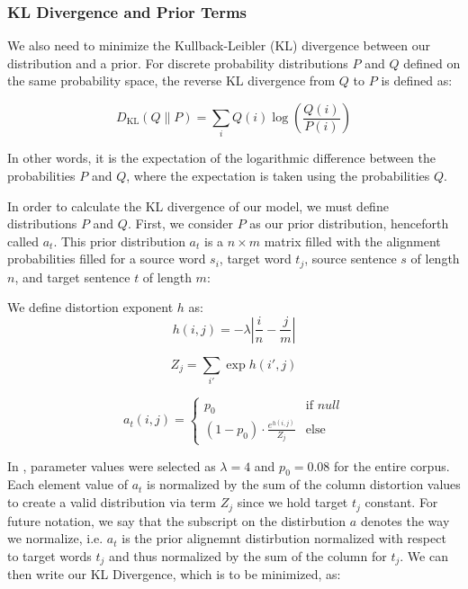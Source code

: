 \documentclass[twoside,twocolumn]{article}
\begin{document}
\subsubsection{KL Divergence and Prior Terms}

We also need to minimize the Kullback-Leibler (KL) divergence between our
distribution and a prior. For discrete probability distributions $P$ and $Q$
defined on the same probability space, the reverse KL divergence from $Q$ to
$P$ is defined as:

\begin{equation}
D_{\mathrm{KL}}(Q \| P) = \sum_{i} Q(i) \log \left( \frac{Q(i)}{P(i)} \right)
\end{equation}

In other words, it is the expectation of the logarithmic difference between the
probabilities $P$ and $Q$, where the expectation is taken using the
probabilities $Q$.

In order to calculate the KL divergence of our model, we must define
distributions $P$ and $Q$. First, we consider $P$ as our prior
distribution, henceforth called $a_t$. This prior distribution $a_t$ is a
$n \times m$ matrix filled with the alignment probabilities filled for a source
word $s_i$, target word $t_j$, source sentence $s$ of length $n$, and target
sentence $t$ of length $m$:

We define distortion exponent $h$ as:
\begin{equation}
  h(i, j) = {-\lambda \left| \frac{i}{n} - \frac{j}{m}\right|}
\end{equation}

\begin{equation}
  Z_j = \sum_{i'} \exp h(i', j)
\end{equation}

\begin{equation}
a_t (i, j) =
\begin{cases}
      p_0 & \text{if } null \\
     (1-p_0) \cdot \frac{e^{h(i,j)}}{Z_j} & \text{else}
   \end{cases}
\end{equation}

In \cite{dyer2013simple}, parameter values were selected as $\lambda=4$ and $p_0=0.08$
for the entire corpus. Each element value of $a_t$ is normalized by the sum of the column
distortion values to create a valid distribution via term $Z_j$ since we hold target $t_j$ constant. For future notation, we say that the subscript on the distirbution $a$ denotes the way we normalize, i.e. $a_t$ is the prior alignemnt distirbution normalized with respect to target words $t_j$ and thus normalized by the sum of the column for $t_j$.
We can then write our KL Divergence, which is to be minimized, as:
\end{document}
